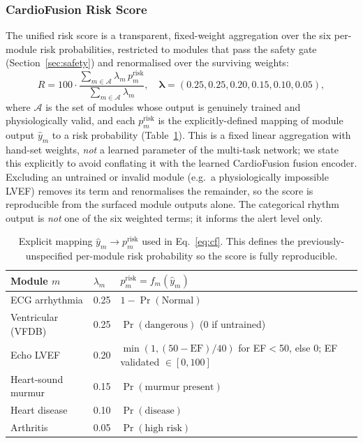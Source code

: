 \documentclass[AMA,STIX1COL,]{WileyNJD-v2}
\begin{document}
\subsubsection{CardioFusion Risk Score}

The unified risk score is a transparent, fixed-weight aggregation over
the six per-module risk probabilities, restricted to modules that pass
the safety gate (Section~\ref{sec:safety}) and renormalised over the
surviving weights:
\begin{equation}
R = 100\cdot\frac{\sum_{m\in\mathcal{A}}\lambda_m\, p^{\mathrm{risk}}_m}
                 {\sum_{m\in\mathcal{A}}\lambda_m},
\quad \boldsymbol{\lambda}=(0.25,0.25,0.20,0.15,0.10,0.05),
\label{eq:cf}
\end{equation}
where $\mathcal{A}$ is the set of modules whose output is genuinely
trained and physiologically valid, and each $p^{\mathrm{risk}}_m$ is the
explicitly-defined mapping of module output $\hat{y}_m$ to a risk
probability (Table~\ref{tab:riskmap}). This is a fixed linear
aggregation with hand-set weights, \emph{not} a learned parameter of
the multi-task network; we state this explicitly to avoid conflating
it with the learned CardioFusion fusion encoder. Excluding an untrained
or invalid module (e.g.\ a physiologically impossible LVEF) removes its
term and renormalises the remainder, so the score is reproducible from
the surfaced module outputs alone. The categorical rhythm output is
\emph{not} one of the six weighted terms; it informs the alert level
only.

\begin{table}[!t]
\caption{Explicit mapping $\hat{y}_m \to p^{\mathrm{risk}}_m$ used in
Eq.~\eqref{eq:cf}. This defines the previously-unspecified per-module
risk probability so the score is fully reproducible.}
\label{tab:riskmap}
\centering
\renewcommand{\arraystretch}{1.2}
\small\begin{tabular}{p{2.3cm}p{0.7cm}p{4.2cm}}
\toprule
\textbf{Module $m$} & $\lambda_m$ & \textbf{$p^{\mathrm{risk}}_m = f_m(\hat{y}_m)$}\\
\midrule
ECG arrhythmia   & 0.25 & $1-\Pr(\text{Normal})$\\
Ventricular (VFDB) & 0.25 & $\Pr(\text{dangerous})$ (0 if untrained)\\
Echo LVEF        & 0.20 & $\min(1,(50-\mathrm{EF})/40)$ for EF$<$50, else 0; EF validated $\in[0,100]$\\
Heart-sound murmur & 0.15 & $\Pr(\text{murmur present})$\\
Heart disease    & 0.10 & $\Pr(\text{disease})$\\
Arthritis        & 0.05 & $\Pr(\text{high risk})$\\
\bottomrule
\end{tabular}
\end{table}
\end{document}
